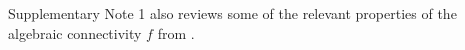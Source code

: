 \documentclass[%
 reprint,
 amsmath,amssymb,
 aip,
]{revtex4-2}
\def \bX {\pmb{X}}
\theoremstyle{italichead}
\theoremstyle{definition}
\begin{document}
{{%

{%
Supplementary Note 1 also reviews some of the relevant properties of the algebraic connectivity $f$ from \cite{wu2007synchronization}.}}




}
\end{document}

